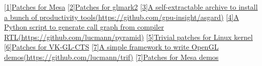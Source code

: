 
\begin{cventries}
    \cventry
    {}
    {\hypertarget{mesa-mr}{\href{https://gitlab.freedesktop.org/mesa/mesa/-/merge\_requests?scope=all&state=all&author\_username=lucmann}{[1]Patches for Mesa}}}
    {}
    {}
    {}
    \cventry
    {}
    {\hypertarget{cpp-proj}{\href{https://github.com/glmark2/glmark2/commits/master/?author=lucmann}{[2]Patches for glmark2}}}
    {}
    {}
    {}
    \cventry
    {}
    {\hypertarget{shell-proj}{\href{https://github.com/gpu-insight/asgard}{[3]A self-extractable archive to install a bunch of productivity tools\newline(https://github.com/gpu-insight/asgard)}}}
    {}
    {}
    {}
    \cventry
    {}
    {\hypertarget{python-proj}{\href{https://github.com/lucmann/pyramid}{[4]A Python script to generate call graph from compiler RTL\newline(https://github.com/lucmann/pyramid)}}}
    {}
    {}
    {}
    \cventry
    {}
    {\hypertarget{linux-patches}{\href{https://git.kernel.org/pub/scm/linux/kernel/git/torvalds/linux.git/log/?qt=author&q=Luc+Ma}{[5]Trivial patches for Linux kernel}}}
    {}
    {}
    {}
    \cventry
    {}
    {\href{https://github.com/KhronosGroup/VK-GL-CTS/commits/main/?author=lucmann}{[6]Patches for VK-GL-CTS}}
    {}
    {}
    {}
    \cventry
    {}
    {\href{https://github.com/lucmann/trif}{[7]A simple framework to write OpenGL demos\newline(https://github.com/lucmann/trif)}}
    {}
    {}
    {}
    \cventry
    {}
    {\href{https://gitlab.freedesktop.org/lucmann/demos/-/commits/main?author=Luc%20Ma}{[7]Patches for Mesa demos}}
    {}
    {}
    {}
\end{cventries}
